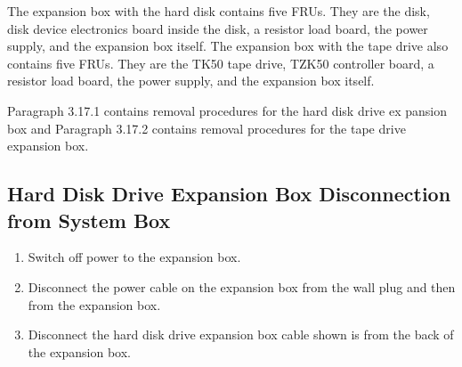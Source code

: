The expansion box with the hard disk contains five FRUs. They are the
disk, disk device electronics board inside the disk, a resistor load board,
the power supply, and the expansion box itself. The expansion box with the
tape drive also contains five FRUs. They are the TK50 tape drive, TZK50
controller board, a resistor load board, the power supply, and the expansion
box itself.

Paragraph 3.17.1 contains removal procedures for the hard disk drive ex
pansion box and Paragraph 3.17.2 contains removal procedures for the tape
drive expansion box.

\subsection{Hard Disk Drive Expansion Box Disconnection from System Box}
\begin{enumerate}
\item	Switch off power to the expansion box.
\item	Disconnect the power cable on the expansion box from the wall plug
		and then from the expansion box.
\newpage
\item	Disconnect the hard disk drive expansion box cable shown is 
		 from the back of the expansion box.
\end{enumerate}
\newpage

